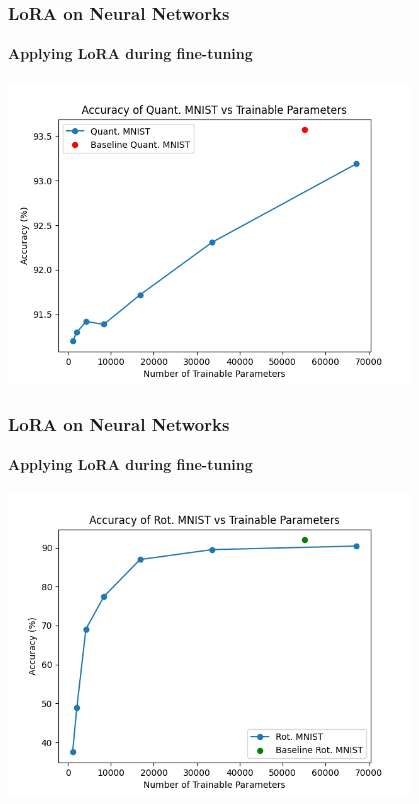 \documentclass{beamer}
\begin{document}
        \begin{frame}
        \frametitle{LoRA on Neural Networks}
        \framesubtitle{Applying LoRA during fine-tuning}
        \begin{center}
            \includegraphics[width=0.8\textwidth]{images/Quantised fine tune plot.png} %
        \end{center}
    \end{frame}
    
    \begin{frame}
        \frametitle{LoRA on Neural Networks}
        \framesubtitle{Applying LoRA during fine-tuning}
        \begin{center}
            \includegraphics[width=0.8\textwidth]{images/rot mnist plot.png} %
        \end{center}
    \end{frame}
    
\end{document}

